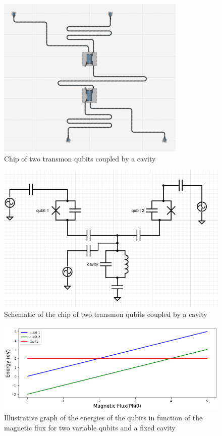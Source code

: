 \documentclass[12pt]{article}
\numberwithin{equation}{subsection}
\begin{document}
\begin{figure}[h]
\centering
\includegraphics[scale=0.6]{images/metal-2qubits-cavity.png}
\caption{Chip of two transmon qubits coupled by a cavity}
\label{metal-cavity}
\end{figure}

\begin{figure}[h]
\centering
\includegraphics[scale=0.6]{images/metal-schematic-cavity.png}
\caption{Schematic of the chip of two transmon qubits coupled by a cavity}
\label{metal-schematic-cavity}
\end{figure}


\begin{figure}[h]
\centering
\includegraphics[width=\maxwidth,height=\maxheight,keepaspectratio]{images/metal-graph-cavity.png}
\caption{Illustrative graph of the energies of the qubits in function of the magnetic flux for two variable  qubits and a fixed cavity}
\label{metal-graph-cavity}
\end{figure}
\end{document}
